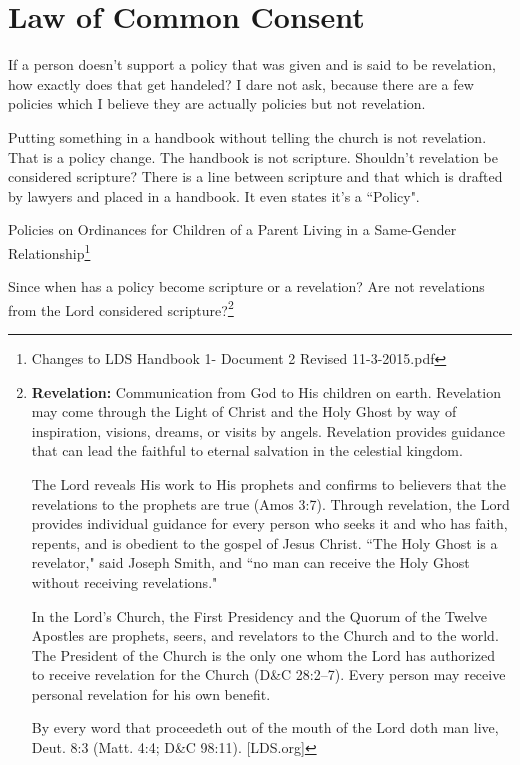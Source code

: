 \chapter{Law of Common Consent}

If a person doesn't support a policy that was given and is said to be revelation, how
exactly does that get handeled? I dare not ask, because there are a few policies
which I believe they are actually policies but not revelation.

Putting something in a handbook without telling the church is not revelation. That is
a policy change. The handbook is not scripture. Shouldn't revelation be considered
scripture? There is a line between scripture and that which is drafted by lawyers and
placed in a handbook. It even states it's a ``Policy".

\begin{displayquote}
Policies on Ordinances for Children of a Parent Living in a Same-Gender
Relationship\footnote{Changes to LDS Handbook 1- Document 2 Revised 11-3-2015.pdf}
\end{displayquote}

Since when has a policy become scripture or a revelation? Are not revelations from
the Lord considered scripture?\footnote{\textbf{Revelation:} Communication from God 
to His children on earth. Revelation may come through the Light of Christ and the 
Holy Ghost by way of inspiration, visions, dreams, or visits by angels. Revelation 
provides guidance that can lead the faithful to eternal salvation in the celestial 
kingdom.

The Lord reveals His work to His prophets and confirms to believers that the 
revelations to the prophets are true (Amos 3:7). Through revelation, the Lord 
provides individual guidance for every person who seeks it and who has faith, 
repents, and is obedient to the gospel of Jesus Christ. ``The Holy Ghost is a 
revelator," said Joseph Smith, and ``no man can receive the Holy Ghost without 
receiving revelations."

In the Lord’s Church, the First Presidency and the Quorum of the Twelve Apostles are 
prophets, seers, and revelators to the Church and to the world. The President of the 
Church is the only one whom the Lord has authorized to receive revelation for the 
Church (D\&C 28:2–7). Every person may receive personal revelation for his own 
benefit.

By every word that proceedeth out of the mouth of the Lord doth man live, Deut. 8:3
(Matt. 4:4; D\&C 98:11). [LDS.org]}

